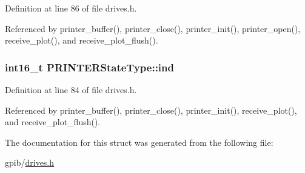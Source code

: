 Definition at line 86 of file drives.\+h.



Referenced by printer\+\_\+buffer(), printer\+\_\+close(), printer\+\_\+init(), printer\+\_\+open(), receive\+\_\+plot(), and receive\+\_\+plot\+\_\+flush().

\subsubsection[{\texorpdfstring{ind}{ind}}]{\setlength{\rightskip}{0pt plus 5cm}int16\+\_\+t P\+R\+I\+N\+T\+E\+R\+State\+Type\+::ind}\hypertarget{structPRINTERStateType_a7d8873d0011f31d7dd00c2b7e0d362bd}{}\label{structPRINTERStateType_a7d8873d0011f31d7dd00c2b7e0d362bd}


Definition at line 84 of file drives.\+h.



Referenced by printer\+\_\+buffer(), printer\+\_\+close(), printer\+\_\+init(), receive\+\_\+plot(), and receive\+\_\+plot\+\_\+flush().



The documentation for this struct was generated from the following file\+:\begin{DoxyCompactItemize}
\item 
gpib/\hyperlink{drives_8h}{drives.\+h}\end{DoxyCompactItemize}
